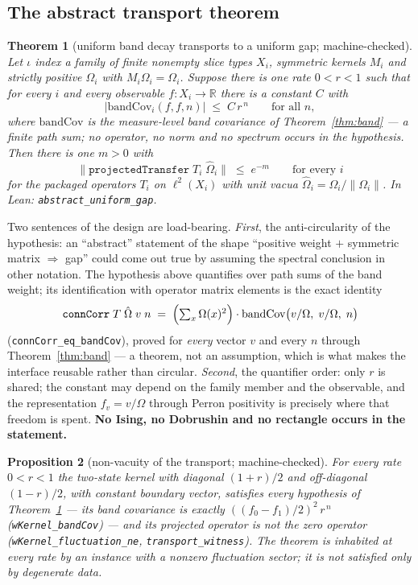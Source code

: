 \documentclass[11pt]{article}
\newtheorem{theorem}{Theorem}[section]
\newtheorem{proposition}[theorem]{Proposition}
\theoremstyle{definition}
\newcommand{\R}{\mathbb{R}}
\begin{document}
\subsection{The abstract transport theorem}

\begin{theorem}[uniform band decay transports to a uniform gap;
machine-checked]
\label{thm:transport}
Let $\iota$ index a family of finite nonempty slice types $X_i$, symmetric
kernels $M_i$ and strictly positive $\Omega_i$ with $M_i\Omega_i=\Omega_i$.
Suppose there is one rate $0<r<1$ such that for every $i$ and every
observable $f:X_i\to\R$ there is a constant $C$ with
\[
  \bigl|\mathrm{bandCov}_i(f,f,n)\bigr|\;\le\;C\,r^{\,n}
  \qquad\text{for all } n,
\]
where $\mathrm{bandCov}$ is the \emph{measure-level} band covariance of
Theorem~\ref{thm:band} --- a finite path sum; no operator, no norm and no
spectrum occurs in the hypothesis.  Then there is one $m>0$ with
\[
  \bigl\|\texttt{projectedTransfer}\;T_i\;\hat\Omega_i\bigr\|\;\le\;e^{-m}
  \qquad\text{for every } i
\]
for the packaged operators $T_i$ on $\ell^2(X_i)$ with unit vacua
$\hat\Omega_i=\Omega_i/\|\Omega_i\|$.  In Lean:
\texttt{abstract\_uniform\_gap}.
\end{theorem}

Two sentences of the design are load-bearing.  \emph{First}, the
anti-circularity of the hypothesis: an ``abstract'' statement of the shape
``positive weight $+$ symmetric matrix $\Rightarrow$ gap'' could come out
true by assuming the spectral conclusion in other notation.  The hypothesis
above quantifies over path sums of the band weight; its identification with
operator matrix elements is the exact identity
\[
  \texttt{connCorr}\;T\;\hat\Omega\;v\;n
  \;=\;\Bigl(\textstyle\sum_x\Omega(x)^2\Bigr)\cdot
  \mathrm{bandCov}\bigl(v/\Omega,\;v/\Omega,\;n\bigr)
\]
(\texttt{connCorr\_eq\_bandCov}), proved for \emph{every} vector $v$ and
every $n$ through Theorem~\ref{thm:band} --- a theorem, not an assumption,
which is what makes the interface reusable rather than circular.
\emph{Second}, the quantifier order: only $r$ is shared; the constant may
depend on the family member and the observable, and the representation
$f_v=v/\Omega$ through Perron positivity is precisely where that freedom is
spent.  \textbf{No Ising, no Dobrushin and no rectangle occurs in the
statement.}

\begin{proposition}[non-vacuity of the transport; machine-checked]
\label{prop:transport-witness}
For every rate $0<r<1$ the two-state kernel with diagonal $(1+r)/2$ and
off-diagonal $(1-r)/2$, with constant boundary vector, satisfies every
hypothesis of Theorem~\ref{thm:transport} --- its band covariance is
\emph{exactly} $((f_0-f_1)/2)^2\,r^{\,n}$ (\texttt{wKernel\_bandCov}) ---
and its projected operator is \emph{not} the zero operator
(\texttt{wKernel\_fluctuation\_ne}, \texttt{transport\_witness}).  The
theorem is inhabited at every rate by an instance with a nonzero
fluctuation sector; it is not satisfied only by degenerate data.
\end{proposition}
\end{document}
